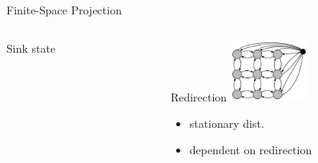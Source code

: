 \documentclass[10pt]{beamer}
\begin{document}
\begin{frame}{Finite-Space Projection}
\begin{columns}
\begin{column}{.30\textwidth}
\begin{block}{Sink state}
            \end{block}
        \end{column}
        \begin{column}{.30\textwidth}
            \begin{block}{Redirection}
                \centering
                \vspace{3mm}
                \includegraphics[height=2cm]{../gfx/state_space_reentry.pdf}
                {\small
                \begin{itemize}
                    \item stationary dist.
                    \item dependent on redirection
                \end{itemize}
                }
            \end{block}
        \end{column}
    \end{columns}
\end{frame}
\end{document}
